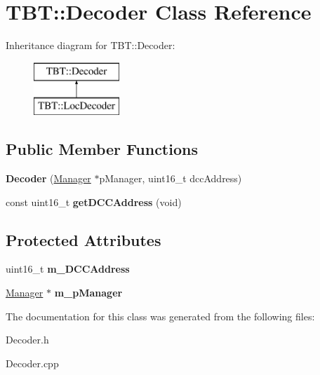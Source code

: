 \hypertarget{classTBT_1_1Decoder}{}\section{T\+BT\+:\+:Decoder Class Reference}
\label{classTBT_1_1Decoder}
Inheritance diagram for T\+BT\+:\+:Decoder\+:\begin{figure}[H]
\begin{center}
\leavevmode
\includegraphics[height=2.000000cm]{classTBT_1_1Decoder}
\end{center}
\end{figure}
\subsection*{Public Member Functions}
\begin{DoxyCompactItemize}
\item 
\mbox{\label{classTBT_1_1Decoder_a69cc50cb8ca993a98802303b1c70eade}} 
{\bfseries Decoder} (\hyperlink{classTBT_1_1Manager}{Manager} $\ast$p\+Manager, uint16\+\_\+t dcc\+Address)
\item 
\mbox{\label{classTBT_1_1Decoder_ad948e489ff1246effdfda3e68d693593}} 
const uint16\+\_\+t {\bfseries get\+D\+C\+C\+Address} (void)
\end{DoxyCompactItemize}
\subsection*{Protected Attributes}
\begin{DoxyCompactItemize}
\item 
\mbox{\label{classTBT_1_1Decoder_a14309179167dd46b722982301d651c4d}} 
uint16\+\_\+t {\bfseries m\+\_\+\+D\+C\+C\+Address}
\item 
\mbox{\label{classTBT_1_1Decoder_a400475d21ba933f8b91e6f7d3053518b}} 
\hyperlink{classTBT_1_1Manager}{Manager} $\ast$ {\bfseries m\+\_\+p\+Manager}
\end{DoxyCompactItemize}


The documentation for this class was generated from the following files\+:\begin{DoxyCompactItemize}
\item 
Decoder.\+h\item 
Decoder.\+cpp\end{DoxyCompactItemize}
